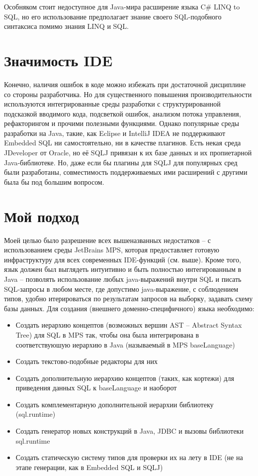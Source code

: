 \documentclass[12pt]{article}
\begin{document}
Особняком стоит недоступное для Java-мира расширение языка C\# LINQ to SQL, но его использование предполагает знание своего SQL-подобного синтаксиса помимо знания LINQ и SQL.\\

\section{Значимость IDE}
Конечно, наличия ошибок в коде можно избежать при достаточной дисциплине со стороны разработчика. Но для существенного повышения производительности используются интегрированные среды разработки с структурированной подсказкой вводимого кода, подсветкой ошибок, анализом потока управления, рефакторингом и прочими полезными функциями. Однако популярные среды разработки на Java, такие, как Eclipse и IntelliJ IDEA не поддерживают Embedded SQL ни самостоятельно, ни в качестве плагинов. Есть некая среда JDeveloper от Oracle, но её SQLJ привязан к их базе данных и их пропиетарной Java-библиотеке. Но, даже если бы плагины для SQLJ для популярных сред были разработаны, совместимость поддерживаемых ими расширений с другими была бы под большим вопросом.

\section{Мой подход}
Моей целью было разрешение всех вышеназванных недостатков -- с использованием среды JetBrains MPS, которая предоставляет готовую инфраструктуру для всех современных IDE-функций (см. выше). Кроме того, язык должен был выглядеть интуитивно и быть полностью интегированным в Java -- позволять использование любых java-выражений внутри SQL и писать SQL-запросы в любом месте, где допустимо java-выражение, с соблюдением типов, удобно итерироваться по результатам запросов на выборку, задавать схему базы данных. Для создания (внешнего доменно-специфичного) языка необходимо:
\begin{itemize}
\item Создать иерархию концептов (возможных вершин AST -- Abstract Syntax Tree) для SQL в MPS так, чтобы она была интегрирована в соответствуюшую иерархию в Java (называемый в MPS baseLanguage)
\item Создать текстово-подобные редакторы для них
\item Создать дополнительную иерархию концептов (таких, как кортежи) для приведения данных SQL к baseLanguage и наоборот
\item Создать комплементарную дополнительной иерархии библиотеку (sql.runtime)
\item Создать генератор новых конструкций в Java, JDBC и вызовы библиотеки sql.runtime
\item Создать статическую систему типов для проверки их на лету в IDE (не на этапе генерации, как в Embedded SQL и SQLJ)
\end{itemize}
\end{document}
